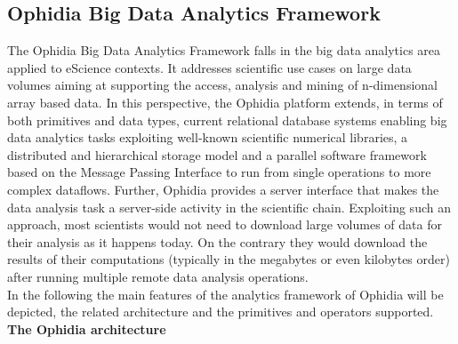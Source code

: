 
\subsection{Ophidia Big Data Analytics Framework}
\label{sec: background/ophidia}

The Ophidia Big Data Analytics Framework falls in the big data analytics area applied to eScience contexts.
It addresses scientific use cases on large data volumes aiming at supporting the access, analysis and mining of n-dimensional array based data. In this perspective, the Ophidia platform extends, in terms of both primitives and data types, current relational database systems enabling big data analytics tasks exploiting well-known scientific numerical libraries, a distributed and hierarchical storage model and a parallel software framework based on the Message Passing Interface to run from single operations to more complex dataflows. Further, Ophidia provides a server interface that makes the data analysis task a server-side activity in the scientific chain. Exploiting such an approach, most scientists would not need to download large volumes of data for their analysis as it happens today. On the contrary they would download the results of their computations (typically in the megabytes or even kilobytes order) after running multiple remote data analysis operations.\\

In the following the main features of the analytics framework of Ophidia will be depicted, the related architecture and the primitives and operators supported.\\

\textbf{The Ophidia architecture}\\

